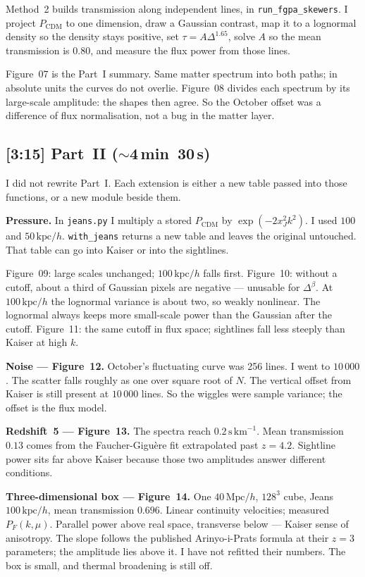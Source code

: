 \documentclass[11pt]{article}
\begin{document}
Method~2 builds transmission along independent lines, in \texttt{run\_fgpa\_skewers}.
I project $P_\mathrm{CDM}$ to one dimension, draw a Gaussian contrast, map it to a lognormal density so the density stays positive, set $\tau=A\Delta^{1.65}$, solve $A$ so the mean transmission is $0.80$, and measure the flux power from those lines.

Figure~07 is the Part~I summary.
Same matter spectrum into both paths; in absolute units the curves do not overlie.
Figure~08 divides each spectrum by its large-scale amplitude: the shapes then agree.
So the October offset was a difference of flux normalisation, not a bug in the matter layer.

\subsection*{[3:15] Part~II ($\sim$4\,min~30\,s)}

I did not rewrite Part~I.
Each extension is either a new table passed into those functions, or a new module beside them.

\textbf{Pressure.}
In \texttt{jeans.py} I multiply a stored $P_\mathrm{CDM}$ by $\exp(-2 x_J^{2} k^{2})$.
I used $100$ and $50\,\mathrm{kpc}/h$.
\texttt{with\_jeans} returns a new table and leaves the original untouched.
That table can go into Kaiser or into the sightlines.

Figure~09: large scales unchanged; $100\,\mathrm{kpc}/h$ falls first.
Figure~10: without a cutoff, about a third of Gaussian pixels are negative --- unusable for $\Delta^{\beta}$.
At $100\,\mathrm{kpc}/h$ the lognormal variance is about two, so weakly nonlinear.
The lognormal always keeps more small-scale power than the Gaussian after the cutoff.
Figure~11: the same cutoff in flux space; sightlines fall less steeply than Kaiser at high $k$.

\textbf{Noise --- Figure~12.}
October's fluctuating curve was 256 lines.
I went to $10\,000$.
The scatter falls roughly as one over square root of $N$.
The vertical offset from Kaiser is still present at $10\,000$ lines.
So the wiggles were sample variance; the offset is the flux model.

\textbf{Redshift~5 --- Figure~13.}
The spectra reach $0.2\,\mathrm{s\,km}^{-1}$.
Mean transmission $0.13$ comes from the Faucher-Gigu\`ere fit extrapolated past $z=4.2$.
Sightline power sits far above Kaiser because those two amplitudes answer different conditions.

\textbf{Three-dimensional box --- Figure~14.}
One $40\,\mathrm{Mpc}/h$, $128^{3}$ cube, Jeans $100\,\mathrm{kpc}/h$, mean transmission $0.696$.
Linear continuity velocities; measured $P_F(k,\mu)$.
Parallel power above real space, transverse below --- Kaiser sense of anisotropy.
The slope follows the published Arinyo-i-Prats formula at their $z=3$ parameters; the amplitude lies above it.
I have not refitted their numbers.
The box is small, and thermal broadening is still off.
\end{document}
